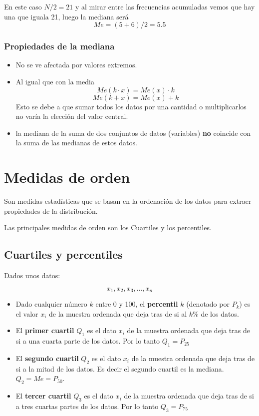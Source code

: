 \documentclass[]{article}
\providecommand{\tightlist}{%
  \setlength{\itemsep}{0pt}\setlength{\parskip}{0pt}}
\theoremstyle{plain}
\theoremstyle{definition}
\theoremstyle{definition} %
\begin{document}
En este caso \(N/2= 21\) y al mirar entre las frecuencias acumuladas
vemos que hay una que iguala 21, luego la mediana será
\[Me = (5+6)/2 = 5.5\]

\hypertarget{propiedades-de-la-mediana}{%
\subsubsection{Propiedades de la
mediana}\label{propiedades-de-la-mediana}}

\begin{itemize}
\tightlist
\item
  No se ve afectada por valores extremos.
\item
  Al igual que con la media \[Me(k\cdot x) = Me(x) \cdot k\]
  \[Me(k+ x) = Me(x) + k\] Esto se debe a que sumar todos los datos por
  una cantidad o multiplicarlos no varía la elección del valor central.
\item
  la mediana de la suma de dos conjuntos de datos (variables)
  \textbf{no} coincide con la suma de las medianas de estos datos.
\end{itemize}

\hypertarget{medidas-de-orden}{%
\section{Medidas de orden}\label{medidas-de-orden}}

Son medidas estadísticas que se basan en la ordenación de los datos para
extraer propiedades de la distribución.

Las principales medidas de orden son los Cuartiles y los percentiles.

\hypertarget{cuartiles-y-percentiles}{%
\subsection{Cuartiles y percentiles}\label{cuartiles-y-percentiles}}

Dados unos datos:

\[x_1, x_2, x_3,\ldots , x_n\]

\begin{itemize}
\tightlist
\item
  Dado cualquier número \(k\) entre 0 y 100, el \textbf{percentil} \(k\)
  (denotado por \(P_k\)) es el valor \(x_i\) de la muestra ordenada que
  deja tras de si al \(k\%\) de los datos.
\item
  El \textbf{primer cuartil} \(Q_1\) es el dato \(x_i\) de la muestra
  ordenada que deja tras de si a una cuarta parte de los datos. Por lo
  tanto \(Q_1 = P_{25}\)
\item
  El \textbf{segundo cuartil} \(Q_2\) es el dato \(x_i\) de la muestra
  ordenada que deja tras de si a la mitad de los datos. Es decir el
  segundo cuartil es la mediana. \(Q_2 = Me = P_{50}\).
\item
  El \textbf{tercer cuartil} \(Q_3\) es el dato \(x_i\) de la muestra
  ordenada que deja tras de si a tres cuartas partes de los datos. Por
  lo tanto \(Q_3 = P_{75}\)
\end{itemize}
\end{document}
